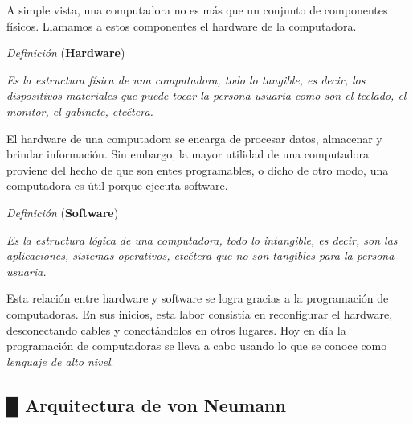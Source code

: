 \documentclass[11pt,spanish]{article}
\begin{document}
A simple vista, una computadora no es más que un conjunto de componentes
físicos. Llamamos a estos componentes el hardware de la computadora.

\begin{bclogo}[noborder=true, couleurBarre=celestialblue,arrondi =0.1, couleur =anti-flashwhite, logo=\bcplume, marge =10]{\textit{Definición} (\textbf{Hardware})}
\vspace{0.25cm}

\emph{Es la estructura física de una computadora, todo lo tangible,
es decir, los dispositivos materiales que puede tocar la persona usuaria como
son el teclado, el monitor, el gabinete, etcétera.}

\vspace{0.25cm}       
\end{bclogo}

El hardware de una computadora se encarga de procesar datos, almacenar
y brindar información. Sin embargo, la mayor utilidad
de una computadora proviene del hecho de que son entes programables,
o dicho de otro modo, una computadora es útil porque ejecuta software.

\begin{bclogo}[noborder=true, couleurBarre=celestialblue,arrondi =0.1, couleur =anti-flashwhite, logo=\bcplume, marge =10]{\textit{Definición} (\textbf{Software})}
\vspace{0.25cm}

\emph{Es la estructura lógica de una computadora, todo lo intangible,
es decir, son las aplicaciones, sistemas operativos, etcétera que
no son tangibles para la persona usuaria.}

\vspace{0.25cm}       
\end{bclogo}

Esta relación entre hardware y software se logra gracias a la programación
de computadoras. En sus inicios, esta labor consistía en reconfigurar
el hardware, desconectando cables y conectándolos en otros lugares.
Hoy en día la programación de computadoras se lleva a cabo usando
lo que se conoce como \emph{lenguaje de alto nivel}.

\subsection*{\color{celestialblue}█ \quad{}\color{black}Arquitectura de von
Neumann}
\end{document}
